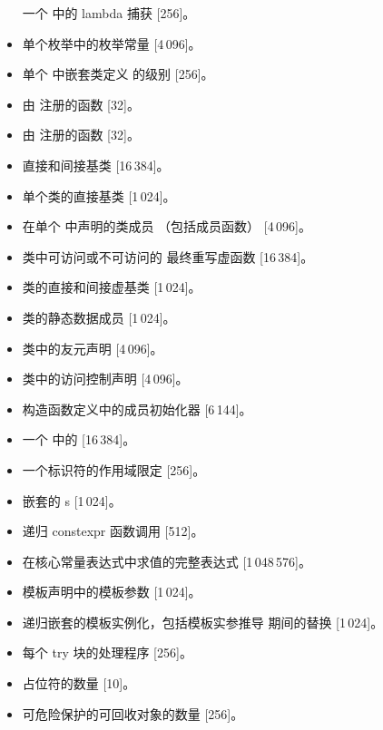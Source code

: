 \begin{itemize}
一个  中的 lambda 捕获 [256]。
\item%
单个枚举中的枚举常量 [4\,096]。
\item%
单个
中嵌套类定义 的级别
[256]。
\item%
由  注册的函数 [32]。
\item%
由  注册的函数 [32]。
\item%
直接和间接基类 [16\,384]。
\item%
单个类的直接基类 [1\,024]。
\item%
在单个  中声明的类成员
（包括成员函数） [4\,096]。
\item%
类中可访问或不可访问的
最终重写虚函数 [16\,384]。
\item%
类的直接和间接虚基类 [1\,024]。
\item%
类的静态数据成员 [1\,024]。
\item%
类中的友元声明 [4\,096]。
\item%
类中的访问控制声明 [4\,096]。
\item%
构造函数定义中的成员初始化器 [6\,144]。
\item%
一个  中的  [16\,384]。
\item%
一个标识符的作用域限定 [256]。
\item%
嵌套的 s [1\,024]。
\item%
递归 constexpr 函数调用 [512]。
\item%
在核心常量表达式中求值的完整表达式 [1\,048\,576]。
\item%
模板声明中的模板参数 [1\,024]。
\item%
递归嵌套的模板实例化，包括模板实参推导
期间的替换 [1\,024]。
\item%
每个 try 块的处理程序 [256]。
\item%
占位符的数量 [10]。
\item%
可危险保护的可回收对象的数量 [256]。
\end{itemize}
